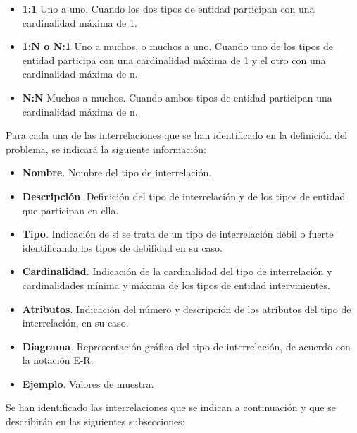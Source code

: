 \begin{itemize}
    \item \textbf{1:1} Uno a uno. Cuando los dos tipos de entidad participan con una cardinalidad máxima de 1.
    \item \textbf{1:N o N:1} Uno a muchos, o muchos a uno. Cuando uno de los tipos de entidad participa con una cardinalidad máxima de 1 y el otro con una cardinalidad máxima de n.
    \item \textbf{N:N} Muchos a muchos. Cuando ambos tipos de entidad participan una cardinalidad máxima de n.
\end{itemize}

Para cada una de las interrelaciones que se han identificado en la definición del problema, se indicará la siguiente información:

\begin{itemize}
    \item \textbf{Nombre}. Nombre del tipo de interrelación.
    \item \textbf{Descripción}. Definición del tipo de interrelación y de los tipos de entidad que participan en ella.
    \item \textbf{Tipo}. Indicación de si se trata de un tipo de interrelación débil o fuerte identificando los tipos de debilidad en su caso.
    \item \textbf{Cardinalidad}. Indicación de la cardinalidad del tipo de interrelación y cardinalidades mínima y máxima de los tipos de entidad intervinientes.
    \item \textbf{Atributos}. Indicación del número y descripción de los atributos del tipo de interrelación, en su caso.
    \item \textbf{Diagrama}. Representación gráfica del tipo de interrelación, de acuerdo con la notación E-R.
    \item \textbf{Ejemplo}. Valores de muestra.
\end{itemize}

Se han identificado las interrelaciones que se indican a continuación y que se describirán en las siguientes subsecciones:

